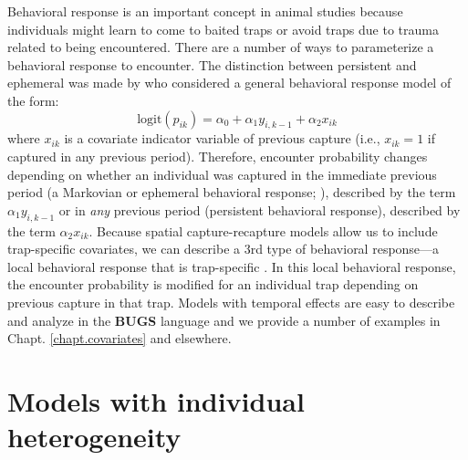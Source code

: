 Behavioral response is an important concept in animal studies
because individuals might learn to come to baited traps or avoid traps
due to trauma related to being encountered.  There are a number of
ways to parameterize a behavioral response to encounter. The
distinction between persistent and ephemeral was made by
\citet{yang_chao:2005} who considered a general behavioral response
model of the form:
\[
\mbox{logit}(p_{ik}) = \alpha_{0} + \alpha_{1} y_{i,k-1} + \alpha_{2} x_{ik}
\]
where $x_{ik}$ is a covariate indicator variable of previous capture
(i.e., $x_{ik} = 1$ if captured in any previous period). Therefore,
encounter probability changes depending on whether an individual was
captured in the immediate previous period (a Markovian or ephemeral behavioral
response; \citep{yang_chao:2005}), described by the term
$\alpha_{1} y_{i,k-1}$ or in {\it any} previous period (persistent behavioral
response), described by the term  $\alpha_{2} x_{ik}$.
Because spatial capture-recapture models allow us to include
trap-specific covariates, we can describe a 3rd type of behavioral
response---a local behavioral response that is trap-specific
\citep{royle_etal:2011jwm}. In this local behavioral response, the
encounter probability is modified for an individual trap depending on
previous capture in that trap.
Models with temporal effects are easy to describe and analyze in the {\bf BUGS} language
and we provide a number of examples in
Chapt. \ref{chapt.covariates} and elsewhere.


\section{ Models with individual heterogeneity}
\label{closed.sec.modelmh}

